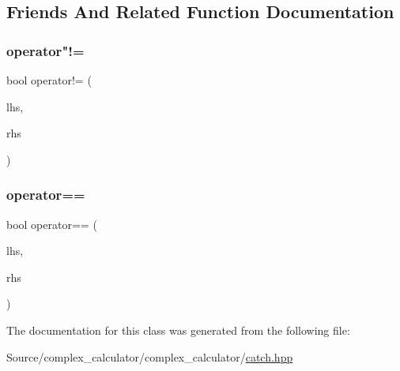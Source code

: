 \subsection{Friends And Related Function Documentation}
\mbox{\label{class_catch_1_1_simple_pcg32_a4940863fe85f6c5a2fa9b3910bfb7406}} 
\subsubsection{\texorpdfstring{operator"!=}{operator!=}}
{\footnotesize\ttfamily bool operator!= (\begin{DoxyParamCaption}\item[{\mbox{\hyperlink{class_catch_1_1_simple_pcg32}{Simple\+Pcg32}} const \&}]{lhs,  }\item[{\mbox{\hyperlink{class_catch_1_1_simple_pcg32}{Simple\+Pcg32}} const \&}]{rhs }\end{DoxyParamCaption})\hspace{0.3cm}{\ttfamily [friend]}}

\mbox{\label{class_catch_1_1_simple_pcg32_a3f1e143181b91f902ce034e2878f87eb}} 
\subsubsection{\texorpdfstring{operator==}{operator==}}
{\footnotesize\ttfamily bool operator== (\begin{DoxyParamCaption}\item[{\mbox{\hyperlink{class_catch_1_1_simple_pcg32}{Simple\+Pcg32}} const \&}]{lhs,  }\item[{\mbox{\hyperlink{class_catch_1_1_simple_pcg32}{Simple\+Pcg32}} const \&}]{rhs }\end{DoxyParamCaption})\hspace{0.3cm}{\ttfamily [friend]}}



The documentation for this class was generated from the following file\+:\begin{DoxyCompactItemize}
\item 
Source/complex\+\_\+calculator/complex\+\_\+calculator/\mbox{\hyperlink{catch_8hpp}{catch.\+hpp}}\end{DoxyCompactItemize}

